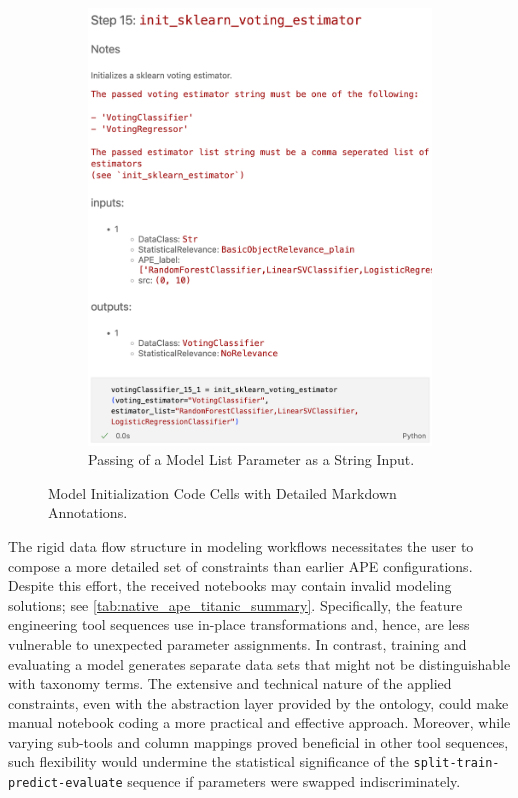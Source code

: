 \begin{figure}[h]
\begin{subfigure}[t]{.47\textwidth}
        \centering
        \includegraphics[width=\textwidth]{Tex//images//native_ape_eval//init_voting_classifier.png}
        \caption{Passing of a Model List Parameter as a String Input.}
        \label{fig:native_ape_init_voting_classifier}
    \end{subfigure}
    \caption{Model Initialization Code Cells with Detailed Markdown Annotations.}
    \label{fig:native_ape_double_init_clf}
\end{figure}

The rigid data flow structure in modeling workflows necessitates the user to compose a more detailed set of constraints than earlier APE configurations. Despite this effort, the received notebooks may contain invalid modeling solutions; see \autoref{tab:native_ape_titanic_summary}. Specifically, the feature engineering tool sequences use in-place transformations and, hence, are less vulnerable to unexpected parameter assignments. In contrast, training and evaluating a model generates separate data sets that might not be distinguishable with taxonomy terms. The extensive and technical nature of the applied constraints, even with the abstraction layer provided by the ontology, could make manual notebook coding a more practical and effective approach. Moreover, while varying sub-tools and column mappings proved beneficial in other tool sequences, such flexibility would undermine the statistical significance of the \verb|split-train-predict-evaluate| sequence if parameters were swapped indiscriminately.

